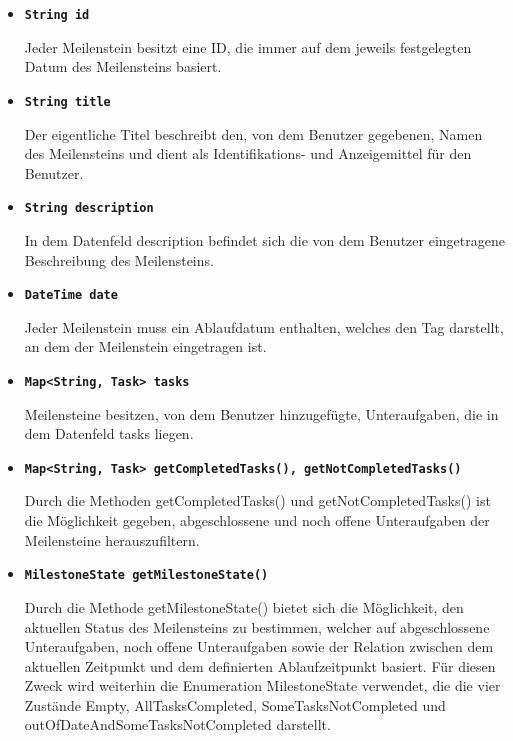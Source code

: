 \documentclass[bibliography=totoc,listof=totoc,BCOR=5mm,DIV=12,oneside]{scrbook}
\begin{document}
\begin{itemize}

\item[] \texttt{\textbf{String id}}
\par Jeder Meilenstein besitzt eine ID, die immer auf dem jeweils festgelegten Datum des Meilensteins basiert.

\item[] \texttt{\textbf{String title}}
\par Der eigentliche Titel beschreibt den, von dem Benutzer gegebenen, Namen des Meilensteins und dient als Identifikations- und Anzeigemittel für den Benutzer.

\item[] \texttt{\textbf{String description}}
\par In dem Datenfeld description befindet sich die von dem Benutzer eingetragene Beschreibung des Meilensteins.

\item[] \texttt{\textbf{DateTime date}}
\par Jeder Meilenstein muss ein Ablaufdatum enthalten, welches den Tag darstellt, an dem der Meilenstein eingetragen ist.

\item[] \texttt{\textbf{Map<String, Task> tasks}}
\par Meilensteine besitzen, von dem Benutzer hinzugefügte, Unteraufgaben, die in dem Datenfeld tasks liegen.

\item[] \texttt{\textbf{Map<String, Task> getCompletedTasks(), getNotCompletedTasks()}}
\par Durch die Methoden getCompletedTasks() und getNotCompletedTasks() ist die Möglichkeit gegeben, abgeschlossene und noch offene Unteraufgaben der Meilensteine herauszufiltern.

\item[] \texttt{\textbf{MilestoneState getMilestoneState()}}
\par Durch die Methode getMilestoneState() bietet sich die Möglichkeit, den aktuellen Status des Meilensteins zu bestimmen, welcher auf abgeschlossene Unteraufgaben, noch offene Unteraufgaben sowie der Relation zwischen dem aktuellen Zeitpunkt und dem definierten Ablaufzeitpunkt basiert. Für diesen Zweck wird weiterhin die Enumeration MilestoneState verwendet, die die vier Zustände Empty, AllTasksCompleted, SomeTasksNotCompleted und outOfDateAndSomeTasksNotCompleted darstellt.
\end{itemize}
\end{document}
